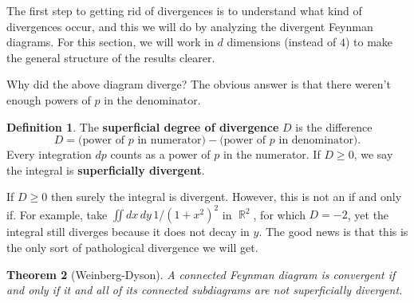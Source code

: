 \documentclass{report}
\theoremstyle{plain}
\newtheorem{theorem}{Theorem}[section]
\theoremstyle{definition}
\newtheorem{definition}[theorem]{Definition}
\theoremstyle{remark}
\DeclareMathOperator{\bR}{\mathbb{R}}
\begin{document}
The first step to getting rid of divergences is to understand what
kind of divergences occur, and this we will do by analyzing the
divergent Feynman diagrams. For this section, we will work in $d$
dimensions (instead of $4$) to make the general structure of the
results clearer.

Why did the above diagram diverge? The obvious answer is that there
weren't enough powers of $p$ in the denominator.

\begin{definition}
  The {\bf superficial degree of divergence} $D$ is the difference
  $$ D = \text{(power of } p \text{ in numerator)} - \text{(power of } p \text{ in denominator)}. $$
  Every integration $dp$ counts as a power of $p$ in the numerator. If
  $D \ge 0$, we say the integral is {\bf superficially divergent}.
\end{definition}

If $D \ge 0$ then surely the integral is divergent. However, this is
not an if and only if. For example, take
$\iint dx \, dy \, 1/(1 + x^2)^2$ in $\bR^2$, for which $D = -2$, yet
the integral still diverges because it does not decay in $y$. The good
news is that this is the only sort of pathological divergence we will
get.

\begin{theorem}[Weinberg-Dyson]
  A connected Feynman diagram is convergent if and only if it and all
  of its connected subdiagrams are not superficially divergent.
\end{theorem}
\end{document}

